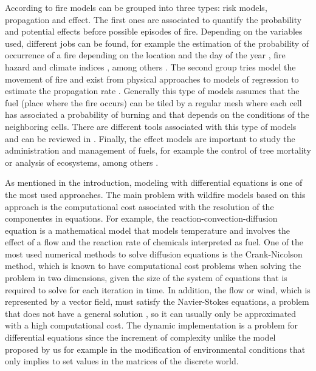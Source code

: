 \documentclass[conference]{IEEEtran}
\begin{document}
    According to \cite{preisler2013forest} fire models can be grouped into three types: risk models, 
    propagation and effect. The first ones are associated to quantify the probability and potential effects before
    possible episodes of fire. Depending on the variables used, different jobs can be found, for example
    the estimation of the probability of occurrence of a fire depending on the location and the day of the year
    \cite{brillinger2003risk, hernandez2010integrating}, fire hazard and climate indices \cite{van1987development,
    burgan19881988}, among others \cite{braun2010forest, ager2007modeling, calkin2011comparative}. The second group tries
    model the movement of fire and exist from physical approaches \cite{rothermel1972mathematical} to models of
    regression to estimate the propagation rate \cite{sullivan2009wildland}. Generally this type of models assumes that
    the fuel (place where the fire occurs) can be tiled by a regular mesh where each cell has
    associated a probability of burning and that depends on the conditions of the neighboring cells. There are different
    tools associated with this type of models and can be reviewed in \cite{andrews1986behave, finney2006overview,
    finney1998farsite, finney2011simulation, finney2011method}. Finally, the effect models are important
    to study the administration and management of fuels, for example the control of tree mortality
    or analysis of ecosystems, among others \cite{Larkin-2009, reinhardt2003using, robichaud2007predicting}. %
    
    As mentioned in the introduction, modeling with differential equations is one of the most used approaches. 
    The main problem with wildfire models based on this approach is the computational cost associated with the 
    resolution of the componentes in equations. For example, the reaction-convection-diffusion equation \cite{liu2009elementary} is 
    a mathematical model that models temperature and involves the effect of a flow and the reaction rate of 
    chemicals interpreted as fuel. One of the most used numerical methods to solve diffusion equations is the 
    Crank-Nicolson method, which is known to have computational cost problems when solving the problem in two 
    dimensions, given the size of the system of equations that is required to solve for each iteration in time. 
    In addition, the flow or wind, which is represented by a vector field, must satisfy the Navier-Stokes 
    equations, a problem that does not have a general solution \cite{fefferman2006existence}, so it can usually 
    only be approximated with a high computational cost. The dynamic implementation is a problem for differential
    equations since the increment of complexity unlike the model proposed by us for example in the modification
    of environmental conditions that only implies to set values in the matrices of the discrete world. %
    
\end{document}

